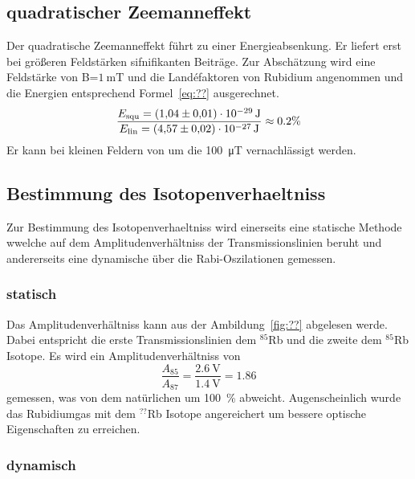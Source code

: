 \begin{table}[h]
\end{table}
\subsection{quadratischer Zeemanneffekt}%
\label{sub:quadratischer_zeemanneffekt}
Der quadratische Zeemanneffekt führt zu einer Energieabsenkung. 
Er liefert erst bei größeren Feldstärken sifnifikanten Beiträge.
Zur Abschätzung wird eine Feldstärke von B=$\SI{1}{\milli\tesla}$ 
und die Land\'efaktoren von Rubidium angenommen und die Energien entsprechend
Formel~\ref{eq:??} ausgerechnet.
\begin{equation}
	\frac{E_\text{squ} = \SI{1.04 +- 0.01e-29}{\joule}}{E_\text{lin} = 
		\SI{4.57 +- 0.02e-27}{\joule}} \approx 0.2 \%
\end{equation}
Er kann bei kleinen Feldern von um die \SI{100}{\micro\tesla} vernachlässigt werden.

\subsection{Bestimmung des Isotopenverhaeltniss}%
\label{sub:bestimmung_des_isotopenverhaeltniss}
Zur Bestimmung des Isotopenverhaeltniss wird einerseits eine statische Methode
wwelche auf dem Amplitudenverhältniss der Transmissionslinien beruht und
andererseits eine dynamische über die Rabi-Oszilationen gemessen.
\subsubsection{statisch}%
\label{ssub:statisch}
Das Amplitudenverhältniss kann aus der Ambildung~\ref{fig:??} abgelesen werde.
Dabei entspricht die erste Transmissionslinien dem $^{85}$Rb und die zweite dem
$^{85}$Rb Isotope.
Es wird ein Amplitudenverhältniss von 
\begin{equation}
	\frac{A_{85}}{A_{87}} = \frac{\SI{2.6}{\volt}}{\SI{1.4}{\volt}} = 1.86 
\end{equation}
gemessen, was von dem natürlichen um \SI{100}{\percent} abweicht.
Augenscheinlich wurde das Rubidiumgas mit dem $^{??}$Rb Isotope angereichert um
bessere optische Eigenschaften zu erreichen.


\subsubsection{dynamisch}%
\label{ssub:dynamisch}

